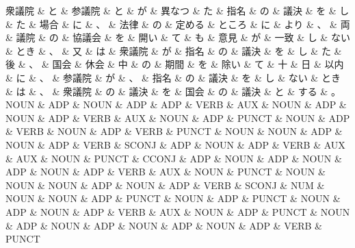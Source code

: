 \documentclass[tikz,border=5pt]{standalone}
\begin{document}
\fontsize{5pt}{6pt}\selectfont
\begin{dependency}[edge unit distance=3.6pt]
    \begin{deptext}[column sep=0.3em]
        衆議院 \& と \& 参議院 \& と \& が \& 異なつ \& た \& 指名 \& の \& 議決 \& を \& し \& た \& 場合 \& に \& 、 \& 法律 \& の \& 定める \& ところ \& に \& より \& 、 \& 両 \& 議院 \& の \& 協議会 \& を \& 開い \& て \& も \& 意見 \& が \& 一致 \& し \& ない \& とき \& 、 \& 又 \& は \& 衆議院 \& が \& 指名 \& の \& 議決 \& を \& し \& た \& 後 \& 、 \& 国会 \& 休会 \& 中 \& の \& 期間 \& を \& 除い \& て \& 十 \& 日 \& 以内 \& に \& 、 \& 参議院 \& が \& 、 \& 指名 \& の \& 議決 \& を \& し \& ない \& とき \& は \& 、 \& 衆議院 \& の \& 議決 \& を \& 国会 \& の \& 議決 \& と \& する \& 。\\
        NOUN \& ADP \& NOUN \& ADP \& ADP \& VERB \& AUX \& NOUN \& ADP \& NOUN \& ADP \& VERB \& AUX \& NOUN \& ADP \& PUNCT \& NOUN \& ADP \& VERB \& NOUN \& ADP \& VERB \& PUNCT \& NOUN \& NOUN \& ADP \& NOUN \& ADP \& VERB \& SCONJ \& ADP \& NOUN \& ADP \& VERB \& AUX \& AUX \& NOUN \& PUNCT \& CCONJ \& ADP \& NOUN \& ADP \& NOUN \& ADP \& NOUN \& ADP \& VERB \& AUX \& NOUN \& PUNCT \& NOUN \& NOUN \& NOUN \& ADP \& NOUN \& ADP \& VERB \& SCONJ \& NUM \& NOUN \& NOUN \& ADP \& PUNCT \& NOUN \& ADP \& PUNCT \& NOUN \& ADP \& NOUN \& ADP \& VERB \& AUX \& NOUN \& ADP \& PUNCT \& NOUN \& ADP \& NOUN \& ADP \& NOUN \& ADP \& NOUN \& ADP \& VERB \& PUNCT\\
    \end{deptext}

\end{dependency}
\end{document}
